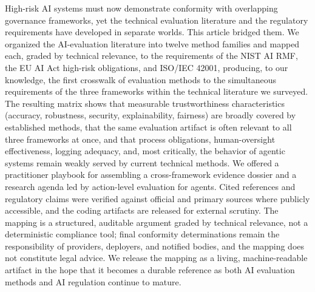High-risk AI systems must now demonstrate conformity with overlapping governance
frameworks, yet the technical evaluation literature and the regulatory requirements have
developed in separate worlds. This article bridged them. We organized the AI-evaluation
literature into twelve method families and mapped each, graded by technical relevance, to
the requirements of the NIST AI RMF, the EU AI Act high-risk obligations, and ISO/IEC
42001, producing, to our knowledge, the first crosswalk of evaluation methods to the
simultaneous requirements of the three frameworks within the technical literature we surveyed. The
resulting matrix shows that measurable trustworthiness characteristics (accuracy,
robustness, security, explainability, fairness) are broadly covered by established methods, that the
same evaluation artifact is often relevant to all three frameworks at once, and that process
obligations, human-oversight effectiveness, logging adequacy, and, most critically, the
behavior of agentic systems remain weakly served by current technical methods. We offered a
practitioner playbook for assembling a cross-framework evidence dossier and a research
agenda led by action-level evaluation for agents. Cited references and regulatory claims
were verified against official and primary sources where publicly accessible, and the
coding artifacts are released for external scrutiny. The mapping is a structured,
auditable argument graded by technical relevance, not a deterministic compliance tool; final
conformity determinations remain the responsibility of providers, deployers, and notified
bodies, and the mapping does not constitute legal advice. We release the
mapping as a living, machine-readable artifact in the hope that it becomes a durable
reference as both AI evaluation methods and AI regulation continue to mature.

